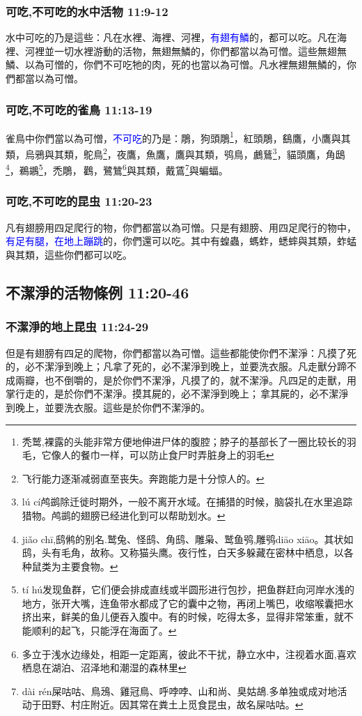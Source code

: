 \subsubsection{可吃,不可吃的水中活物 11:9-12}
水中可吃的乃是這些：凡在水裡、海裡、河裡，\textcolor{blue}{有翅有鱗}的，都可以吃。凡在海裡、河裡並一切水裡游動的活物，無翅無鱗的，你們都當以為可憎。這些無翅無鱗、以為可憎的，你們不可吃牠的肉，死的也當以為可憎。凡水裡無翅無鱗的，你們都當以為可憎。

\subsubsection{可吃,不可吃的雀鳥 11:13-19}
雀鳥中你們當以為可憎，\textcolor{blue}{不可吃}的乃是：鵰，狗頭鵰\footnote{秃鹫,裸露的头能非常方便地伸进尸体的腹腔；脖子的基部长了一圈比较长的羽毛，它像人的餐巾一样，可以防止食尸时弄脏身上的羽毛}，紅頭鵰，鷂鷹，小鷹與其類，烏鴉與其類，鴕鳥\footnote{飞行能力逐渐减弱直至丧失。奔跑能力是十分惊人的。}，夜鷹，魚鷹，鷹與其類，鸮鳥，鸕鶿\footnote{lú cí鸬鹚除迁徙时期外，一般不离开水域。在捕猎的时候，脑袋扎在水里追踪猎物。鸬鹚的翅膀已经进化到可以帮助划水。}，貓頭鷹，角鴟\footnote{jiǎo chī,鸱鸺的别名.鹫兔、怪鸱、角鸱、雕枭、鹫鱼鸮,雕鸮diāo xiāo。其状如鸱，头有毛角，故称。又称猫头鹰。夜行性，白天多躲藏在密林中栖息，以各种鼠类为主要食物。}，鵜鶘\footnote{tí hú发现鱼群，它们便会排成直线或半圆形进行包抄，把鱼群赶向河岸水浅的地方，张开大嘴，连鱼带水都成了它的囊中之物，再闭上嘴巴，收缩喉囊把水挤出来，鲜美的鱼儿便吞入腹中。有的时候，吃得太多，显得非常笨重，就不能顺利的起飞，只能浮在海面了。}，禿鵰， 鸛，鷺鷥\footnote{多立于浅水边缘处，相距一定距离，彼此不干扰，静立水中，注视着水面,喜欢栖息在湖泊、沼泽地和潮湿的森林里}與其類，戴鵀\footnote{dài rén屎咕咕、鳥鴔、雞冠鳥、呼哱哱、山和尚、臭姑鴣.多单独或成对地活动于田野、村庄附近。因其常在粪土上觅食昆虫，故名屎咕咕。}與蝙蝠。

\subsubsection{可吃,不可吃的昆虫 11:20-23}
凡有翅膀用四足爬行的物，你們都當以為可憎。只是有翅膀、用四足爬行的物中，\textcolor{blue}{有足有腿，在地上蹦跳}的，你們還可以吃。其中有蝗蟲，螞蚱，蟋蟀與其類，蚱蜢與其類，這些你們都可以吃。

\subsection{不潔淨的活物條例 11:20-46}
\subsubsection{不潔淨的地上昆虫 11:24-29}
但是有翅膀有四足的爬物，你們都當以為可憎。這些都能使你們不潔淨：凡摸了死的，必不潔淨到晚上；凡拿了死的，必不潔淨到晚上，並要洗衣服。凡走獸分蹄不成兩瓣，也不倒嚼的，是於你們不潔淨，凡摸了的，就不潔淨。凡四足的走獸，用掌行走的，是於你們不潔淨。摸其屍的，必不潔淨到晚上； 拿其屍的，必不潔淨到晚上，並要洗衣服。這些是於你們不潔淨的。

